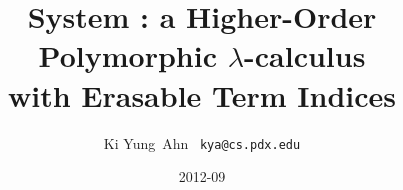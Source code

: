 \documentclass[final]{beamer}
\title[Fancy Posters]{{\VERYHuge System \Fi} {\Huge :}
		{\huge a Higher-Order Polymorphic $\lambda$-calculus} \\
		{\huge with Erasable Term Indices}
  }
\author[Ki Yung Ahn]{ Ki Yung $\,$Ahn $\,$ {\Large\texttt{kya@cs.pdx.edu}} }
\institute[Portland State University]{
	Department of Computer Science, Portland State University }
\date{2012-09}
\begin{document}
\begin{frame}[fragile]
\begin{columns}[t]

\begin{column}{.48\linewidth}


\end{column}
\end{columns}
\end{frame}
\end{document}
